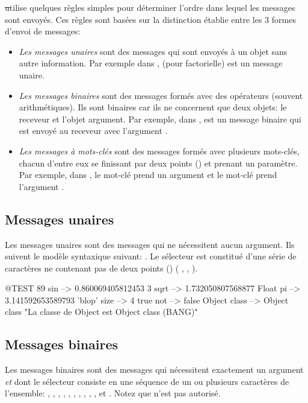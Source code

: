 \documentclass[a4paper,10pt,twoside]{book}
\begin{document}
\st utilise quelques règles simples pour déterminer l'ordre dans lequel 
les messages sont envoyés. Ces règles sont basées sur la distinction établie 
entre les 3 formes d'envoi de messages: 
\begin{itemize}
\item \emph{Les messages unaires} sont des messages qui sont envoyés
  à un objet sans autre information. Par exemple dans ,  (pour factorielle) est un message    
  unaire. 
\item  \emph{Les messages binaires} sont des messages formés avec
  des opérateurs (souvent arithmétiques). Ils sont binaires car
  ils ne concernent que deux objets: le receveur et l'objet
  argument. Par exemple, dans , \ct{+} est un message
  binaire qui est envoyé au receveur  avec l'argument . 
\item  \emph{Les messages à mots-clés} sont des messages formés avec plusieurs mots-clés, chacun d'entre eux se finissant par deux points (\ct{:}) et prenant un paramètre.
Par exemple, dans , le mot-clé 
prend un argument  et le mot-clé  prend l'argument .
\end{itemize}

\subsection{Messages unaires}
Les messages unaires sont des messages qui ne nécessitent aucun
argument. Ils suivent le modèle syntaxique suivant: . Le sélecteur est constitué d'une série de
caractères ne contenant pas de deux points (\ct{:}) (\eg
{}, , ).
\begin{code}{@TEST}
89 sin           --> 0.860069405812453
3 sqrt           --> 1.732050807568877
Float pi         --> 3.141592653589793
'blop' size     --> 4
true not        --> false
Object class --> Object class  "La classe de Object est Object class (BANG)"
\end{code}


\subsection{Messages binaires} 
Les messages binaires sont des messages qui nécessitent exactement un argument \emph{et} dont le sélecteur consiste en une séquence de un ou plusieurs caractères de l'ensemble: \ct{+}, \ct{-}, \ct{*}, \ct{/}, \ct{&}, \ct{=}, \ct{>}, \ct{|}, \ct{<}, \ct{~}, et . Notez que \ct{--} n'est pas autorisé.
\end{document}

